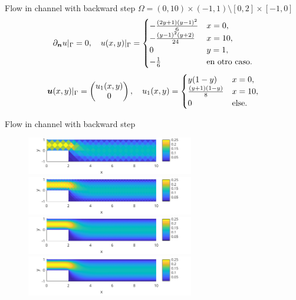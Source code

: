 \documentclass[10pt]{beamer}
\begin{document}
\begin{frame}{Flow in channel with backward step}
$\Omega=(0,10)\times (-1,1)\setminus [0,2]\times[-1,0]$ 
\begin{align*}
  \partial_{\boldsymbol{n}} u|_\Gamma = 0, \quad
  u(x,y)|_\Gamma = \begin{cases}
    -\frac{(2y+1)(y-1)^2}6 & x=0, \\
    -\frac{(y-1)^2(y+2)}{24} & x=10, \\ 
    0 & y = 1, \\
    -\frac16 & \text{en otro caso}.
  \end{cases}
\end{align*}
\begin{align*}
  \boldsymbol{u}(x,y)|_\Gamma = \begin{pmatrix}
  u_1(x,y) \\ 0\end{pmatrix}, 
  \quad u_1(x,y) = \begin{cases}
    y(1-y) & x=0, \\
    \frac{(y+1)(1-y)}8 & x=10, \\
    0 &\text{else}.
  \end{cases}
\end{align*}
\end{frame}
\begin{frame}{Flow in channel with backward step}
  \begin{figure}
      \centering
      \includegraphics[width=0.65\textwidth]{StepVfield2.png}
      \includegraphics[width=0.65\textwidth]{StepVfield3.png}
      \includegraphics[width=0.65\textwidth]{StepVfield4.png}
      \includegraphics[width=0.65\textwidth]{StepVfield5.png}
      \label{fig:enter-label}
  \end{figure}  
\end{frame}
\end{document}
